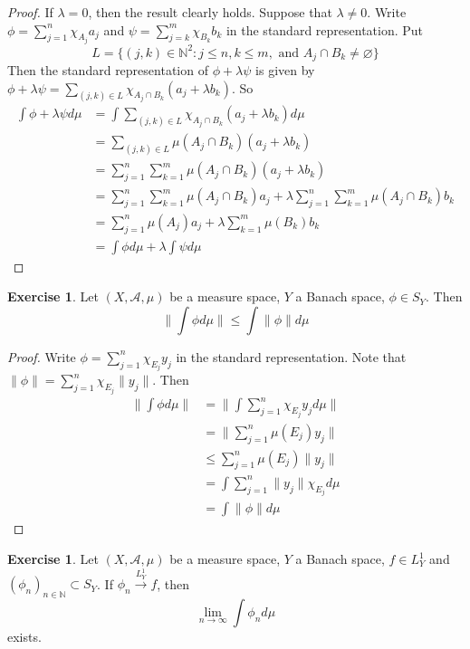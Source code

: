 \documentclass[12pt]{amsart}
\theoremstyle{definition}
\newtheorem{ex}[definition]{Exercise}
\newcommand{\lam}{\lambda}
\newcommand{\N}{\mathbb{N}}
\newcommand{\MA}{\mathcal{A}}
\newcommand{\limn}{\lim \limits_{n \rightarrow \infty}}
\newcommand{\conv}[1]{\xrightarrow{#1}}
\newcommand{\lex}[1]{\label{ex:#1}}
\begin{document}
	\begin{proof}
	If $\lam =0$, then the result clearly holds. Suppose that $\lam \neq 0$.	Write $\phi = \sum\limits_{j=1}^n\chi_{A_j}a_j$ and $\psi = \sum\limits_{j=k}^m\chi_{B_k}b_k$ in the standard representation. Put $$L = \{(j,k) \in \N^2: j \leq n, k \leq m, \text{ and } A_j \cap B_k \neq \varnothing\}$$ Then the standard representation of $\phi + \lam \psi$ is given by  $\phi + \lam \psi = \sum\limits_{(j,k) \in L} \chi_{A_j \cap B_k}(a_j + \lam b_k)$.
	So 
	\begin{align*}
	\int \phi + \lam \psi d \mu 
	&= \int \sum_{(j,k) \in L} \chi_{A_j \cap B_k}(a_j + \lam b_k) d \mu \\
	&= \sum_{(j,k) \in L} \mu(A_j \cap B_k)(a_j + \lam b_k) \\
	&= \sum_{j = 1}^n \sum_{k=1}^m \mu(A_j \cap B_k)(a_j + \lam b_k)  \\ 
	&= \sum_{j = 1}^n \sum_{k=1}^m \mu(A_j \cap B_k)a_j + \lam \sum_{j = 1}^n \sum_{k=1}^m \mu(A_j \cap B_k) b_k \\
	&= \sum_{j = 1}^n \mu(A_j)a_j +  \lam\sum_{k=1}^m \mu(B_k) b_k \\
	&= \int \phi d \mu + \lam \int \psi d\mu 
	\end{align*}
	\end{proof}

	\begin{ex} \lex{00000} 
	Let $(X, \MA, \mu)$ be a measure space, $Y$ a Banach space, $\phi \in S_Y$. Then $$\bigg \| \int \phi d\mu   \bigg \|  \leq \int \|\phi \| d \mu$$
	\end{ex}
	
	\begin{proof}
	Write $\phi = \sum\limits_{j=1}^n\chi_{E_j}y_j$ in the standard representation. Note that $\|\phi \| = \sum\limits_{j=1}^n\chi_{E_j} \|y_j\|$. Then 
	\begin{align*}
	\bigg \|  \int \phi d\mu  \bigg \| 
	&=  \bigg \|  \int \sum\limits_{j=1}^n\chi_{E_j}y_j  d\mu  \bigg \| \\
	&= \bigg \| \sum\limits_{j=1}^n \mu(E_j)y_j \bigg \| \\
	& \leq \sum\limits_{j=1}^n \mu(E_j) \|y_j \| \\
	&= \int \sum\limits_{j=1}^n \|y_j \| \chi_{E_j} d \mu \\
	&= \int \|\phi \| d\mu
	\end{align*}
	\end{proof}
	
	\begin{ex} \lex{00000} 
	Let $(X, \MA, \mu)$ be a measure space, $Y$ a Banach space, $f \in L^1_Y$ and $(\phi_n)_{n \in \N} \subset S_Y$. If $\phi_n \conv{L^1_Y} f$, then $$\limn \int \phi_n d\mu $$ exists.
	\end{ex}
	
\end{document}
